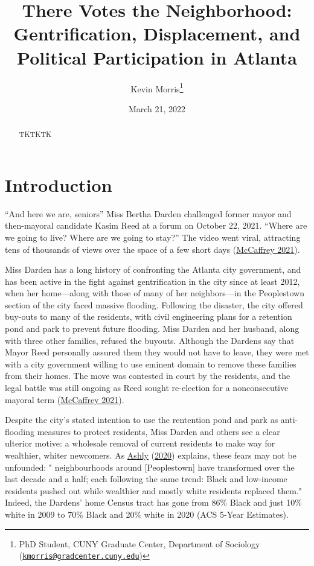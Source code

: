 \documentclass[
  12pt,
]{article}
\title{There Votes the Neighborhood: Gentrification, Displacement, and Political Participation in Atlanta}
\author{Kevin Morris\footnote{PhD Student, CUNY Graduate Center, Department of Sociology (\href{mailto:kmorris@gradcenter.cuny.edu}{\nolinkurl{kmorris@gradcenter.cuny.edu}})}}
\date{March 21, 2022}
\begin{document}
\maketitle
\begin{abstract}
TKTKTK
\end{abstract}

\pagebreak

\doublespacing

\hypertarget{introduction}{%
\section{Introduction}\label{introduction}}

``And here we are, seniors'' Miss Bertha Darden challenged former mayor and then-mayoral candidate Kasim Reed at a forum on October 22, 2021. ``Where are we going to live? Where are we going to stay?'' The video went viral, attracting tens of thousands of views over the space of a few short days (\protect\hyperlink{ref-McCaffrey2021}{McCaffrey 2021}).

Miss Darden has a long history of confronting the Atlanta city government, and has been active in the fight against gentrification in the city since at least 2012, when her home---along with those of many of her neighbors---in the Peoplestown section of the city faced massive flooding. Following the disaster, the city offered buy-outs to many of the residents, with civil engineering plans for a retention pond and park to prevent future flooding. Miss Darden and her husband, along with three other families, refused the buyouts. Although the Dardens say that Mayor Reed personally assured them they would not have to leave, they were met with a city government willing to use eminent domain to remove these families from their homes. The move was contested in court by the residents, and the legal battle was still ongoing as Reed sought re-election for a nonconsecutive mayoral term (\protect\hyperlink{ref-McCaffrey2021}{McCaffrey 2021}).

Despite the city's stated intention to use the rentention pond and park as anti-flooding measures to protect residents, Miss Darden and others see a clear ulterior motive: a wholesale removal of current residents to make way for wealthier, whiter newcomers. As \protect\hyperlink{ref-Ashly2020}{Ashly} (\protect\hyperlink{ref-Ashly2020}{2020}) explains, these fears may not be unfounded: " neighbourhoods around {[}Peoplestown{]} have transformed over the last decade and a half; each following the same trend: Black and low-income residents pushed out while wealthier and mostly white residents replaced them." Indeed, the Dardens' home Census tract has gone from 86\% Black and just 10\% white in 2009 to 70\% Black and 20\% white in 2020 (ACS 5-Year Estimates).
\end{document}
